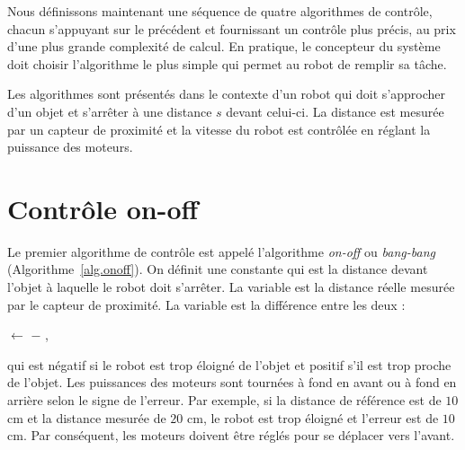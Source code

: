 
Nous définissons maintenant une séquence de quatre algorithmes de contrôle, chacun s'appuyant sur le précédent et fournissant un contrôle plus précis, au prix d'une plus grande complexité de calcul. En pratique, le concepteur du système doit choisir l'algorithme le plus simple qui permet au robot de remplir sa tâche.

Les algorithmes sont présentés dans le contexte d'un robot qui doit s'approcher d'un objet et s'arrêter à une distance $s$ devant celui-ci. La distance est mesurée par un capteur de proximité et la vitesse du robot est contrôlée en réglant la puissance des moteurs.

\section{Contrôle on-off}\label{s.on-off}

Le premier algorithme de contrôle est appelé l'algorithme \emph{on-off} ou \emph{bang-bang} (Algorithme~\ref{alg.onoff}). On définit une constante  qui est la distance devant l'objet à laquelle le robot doit s'arrêter. La variable  est la distance réelle mesurée par le capteur de proximité. La variable  est la différence entre les deux :
\begin{center}
 $\leftarrow$  $-$ ,
\end{center}
qui est négatif si le robot est trop éloigné de l'objet et positif s'il est trop proche de l'objet. Les puissances des moteurs sont tournées à fond en avant ou à fond en arrière selon le signe de l'erreur. Par exemple, si la distance de référence est de $10$ cm et la distance mesurée de $20$ cm, le robot est trop éloigné et l'erreur est de $10$ cm. Par conséquent, les moteurs doivent être réglés pour se déplacer vers l'avant.

